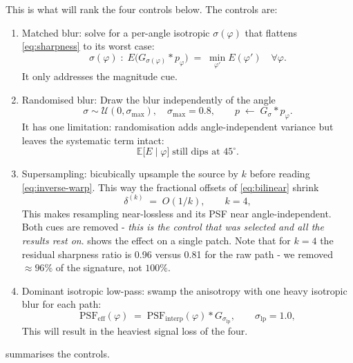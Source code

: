 \documentclass[final_report.tex]{subfiles}
\begin{document}
 This is what will rank the four controls below. The controls are:
\begin{enumerate}
\item Matched blur: solve for a per-angle isotropic $\sigma(\varphi)$ that flattens \cref{eq:sharpness} to its worst case:
\begin{equation}\label{eq:matched-blur}
  \sigma(\varphi) \;:\; E\bigl(G_{\sigma(\varphi)} * p_\varphi\bigr) \;=\; \min_{\varphi'} E(\varphi')
  \quad \forall \varphi .
\end{equation}
It only addresses the magnitude cue.
\item Randomised blur: Draw the blur independently of the angle
\begin{equation}\label{eq:randomised-blur}
  \sigma \sim \mathcal{U}(0, \sigma_{\max}), \quad \sigma_{\max} = 0.8,
  \qquad p \;\leftarrow\; G_\sigma * p_\varphi .
\end{equation}
It has one limitation: randomisation adds angle-independent variance but leaves the systematic term intact:
\begin{equation}\label{eq:randomised-limit}
  \mathbb{E}\bigl[E \mid \varphi\bigr] \;\text{still dips at } 45^\circ .
\end{equation}
\item Supersampling: bicubically upsample the source by $k$ before reading \cref{eq:inverse-warp}. This way the fractional offsets of \cref{eq:bilinear} shrink
 \begin{equation}\label{eq:supersample}
  \delta^{(k)} \;=\; O(1/k), \qquad k = 4 ,
\end{equation}
This makes resampling near-lossless and its PSF near angle-independent. Both cues are removed - \emph{this is the control that was selected and all the results rest on}.  shows the effect on a single patch. Note that for $k=4$ the residual sharpness ratio is 0.96 versus 0.81 for the raw path - we removed $\approx96\%$ of the signature, not $100\%$.
\item Dominant isotropic low-pass: swamp the anisotropy with one heavy isotropic blur for each path:
\begin{equation}\label{eq:dominant-lp}
  \mathrm{PSF}_{\text{eff}}(\varphi) \;=\; \mathrm{PSF}_{\text{interp}}(\varphi) * G_{\sigma_{\mathrm{lp}}},
  \qquad \sigma_{\mathrm{lp}} = 1.0 ,
\end{equation}
This will result in the heaviest signal loss of the four.
\end{enumerate}
 summarises the controls.
\end{document}
